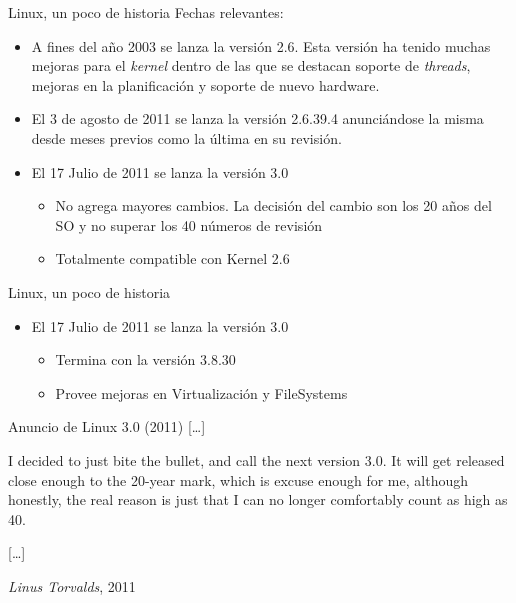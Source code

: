 \begin{frame}{Linux, un poco de historia}
Fechas relevantes:
\begin{itemize}
\item A fines del año 2003 se lanza la versión 2.6. Esta versión ha tenido
  muchas mejoras para el \textit{kernel} dentro de las que se destacan
  soporte de \textit{threads}, mejoras en la planificación y soporte de
  nuevo hardware.

\item El 3 de agosto de 2011 se lanza la versión 2.6.39.4 anunciándose la
  misma desde meses previos como la última en su revisión.

\item El 17 Julio de 2011 se lanza la versión 3.0
    \begin{itemize}
    \item No agrega mayores cambios. La decisión del cambio son los 20 años del SO y no superar los 40 números de revisión
    \item Totalmente compatible con Kernel 2.6
    \end{itemize}

\end{itemize}
\end{frame}

\begin{frame}{Linux, un poco de historia}
\begin{itemize}
\item El 17 Julio de 2011 se lanza la versión 3.0
    \begin{itemize}
    \item Termina con la versión 3.8.30
    \item Provee mejoras en Virtualización y FileSystems
    \end{itemize}
\end{itemize}

\begin{block}{Anuncio de Linux 3.0 \hfill (2011)}
  [\ldots]

  I decided to just bite the bullet, and call the next version 3.0. It will
  get released close enough to the 20-year mark, which is excuse enough for
  me, although honestly, the real reason is just that I can no longer
  comfortably count as high as 40.

  [\ldots]

  \hfill \emph{Linus Torvalds},  2011 \cite{Torvalds2011}
\end{block}
\end{frame}

